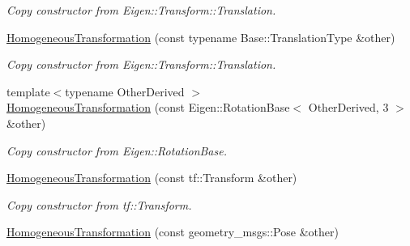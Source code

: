 \begin{DoxyCompactItemize}
\begin{DoxyCompactList}\small\item\em Copy constructor from Eigen\+::\+Transform\+::\+Translation. \end{DoxyCompactList}\item 
\hyperlink{classow__core_1_1HomogeneousTransformation_a9def3964364fb962d1a69fe06686ee9e}{Homogeneous\+Transformation} (const typename Base\+::\+Translation\+Type \&other)\hypertarget{classow__core_1_1HomogeneousTransformation_a9def3964364fb962d1a69fe06686ee9e}{}\label{classow__core_1_1HomogeneousTransformation_a9def3964364fb962d1a69fe06686ee9e}

\begin{DoxyCompactList}\small\item\em Copy constructor from Eigen\+::\+Transform\+::\+Translation. \end{DoxyCompactList}\item 
{\footnotesize template$<$typename Other\+Derived $>$ }\\\hyperlink{classow__core_1_1HomogeneousTransformation_a8ebeed0581c35b89d96a847f01bceddb}{Homogeneous\+Transformation} (const Eigen\+::\+Rotation\+Base$<$ Other\+Derived, 3 $>$ \&other)\hypertarget{classow__core_1_1HomogeneousTransformation_a8ebeed0581c35b89d96a847f01bceddb}{}\label{classow__core_1_1HomogeneousTransformation_a8ebeed0581c35b89d96a847f01bceddb}

\begin{DoxyCompactList}\small\item\em Copy constructor from Eigen\+::\+Rotation\+Base. \end{DoxyCompactList}\item 
\hyperlink{classow__core_1_1HomogeneousTransformation_a93c036ece8c23ef2fc7a9d38a59ff7e8}{Homogeneous\+Transformation} (const tf\+::\+Transform \&other)\hypertarget{classow__core_1_1HomogeneousTransformation_a93c036ece8c23ef2fc7a9d38a59ff7e8}{}\label{classow__core_1_1HomogeneousTransformation_a93c036ece8c23ef2fc7a9d38a59ff7e8}

\begin{DoxyCompactList}\small\item\em Copy constructor from tf\+::\+Transform. \end{DoxyCompactList}\item 
\hyperlink{classow__core_1_1HomogeneousTransformation_af4078447d97d97921a1cde705c661228}{Homogeneous\+Transformation} (const geometry\+\_\+msgs\+::\+Pose \&other)\hypertarget{classow__core_1_1HomogeneousTransformation_af4078447d97d97921a1cde705c661228}{}\label{classow__core_1_1HomogeneousTransformation_af4078447d97d97921a1cde705c661228}


\end{DoxyCompactItemize}
